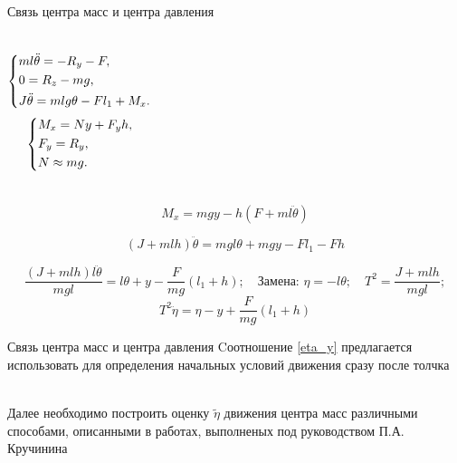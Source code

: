 \documentclass[10pt]{beamer}
\begin{document}
\begin{frame}{Связь центра масс и центра давления}
	\begin{columns}
	\begin{equation}\label{koshisystem}
    \left\{ {\begin{aligned}
                 & ml\ddot{\theta} = -R_y-F , \hfill   \\
                 & 0=R_z-mg, \hfill \\
                 & J \ddot{\theta} = mlg\theta-Fl_1+M_x . \hfill             \\
            \end{aligned}} \right.
\end{equation}
	\begin{equation}\label{koshisystem}
		\left\{ {\begin{aligned}
					 & M_x = Ny+F_yh , \hfill   \\
					 & F_y = R_y , \hfill \\
					 & N \approx mg . \hfill             \\
				\end{aligned}} \right.
	\end{equation}
\end{columns}

	$$M_x=mgy-h\left(F+ml\ddot{\theta}\right)$$

	$$\left(J+mlh\right)\ddot{\theta}=mgl\theta+mgy-Fl_1-Fh$$ 


 	$$\frac{(J+mlh)l\ddot{\theta}}{mgl}=l\theta+y-\frac{F}{mg}(l_1+h);\quad \text{Замена: }\eta=-l\theta; \quad T^2=\frac{J+mlh}{mgl};$$
\begin{equation}\label{eta_y}
	T^2\ddot{\eta}=\eta-y+\frac{F}{mg}(l_1+h)
\end{equation}

\end{frame}

\begin{frame}{Связь центра масс и центра давления}
	Cоотношение \eqref{eta_y} предлагается использовать для определения начальных условий движения сразу после толчка
	
	\hfill \\
	Далее необходимо построить оценку $\tilde\eta$ движения центра масс различными способами, описанными в работах, выполненых под руководством П.А. Кручинина
\end{frame}
\end{document}
